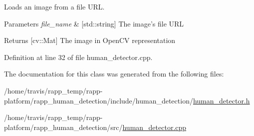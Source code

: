 Loads an image from a file U\-R\-L. 


\begin{DoxyParams}{Parameters}
{\em file\-\_\-name} & \mbox{[}std\-::string\mbox{]} The image's file U\-R\-L \\
\hline
\end{DoxyParams}
\begin{DoxyReturn}{Returns}
\mbox{[}cv\-::\-Mat\mbox{]} The image in Open\-C\-V representation 
\end{DoxyReturn}


Definition at line 32 of file human\-\_\-detector.\-cpp.



The documentation for this class was generated from the following files\-:\begin{DoxyCompactItemize}
\item 
/home/travis/rapp\-\_\-temp/rapp-\/platform/rapp\-\_\-human\-\_\-detection/include/human\-\_\-detection/\hyperlink{human__detector_8h}{human\-\_\-detector.\-h}\item 
/home/travis/rapp\-\_\-temp/rapp-\/platform/rapp\-\_\-human\-\_\-detection/src/\hyperlink{human__detector_8cpp}{human\-\_\-detector.\-cpp}\end{DoxyCompactItemize}
